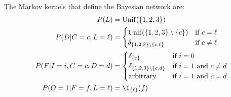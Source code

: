 \begin{enumerate}[label=7.\arabic*]
\begin{gradedsolution}
\begin{enumerate}
            The Markov kernels that define the Bayesian network are:
            \begin{align*}
                P(L)                & = \mathrm{Unif}(\{1, 2, 3\})                                             \\
                P(D|C=c, L=\ell)    & = \begin{cases}
                                            \mathrm{Unif}(\{1, 2, 3\}\setminus \{c\}) & \text{if $c=\ell$}    \\
                                            \delta_{\{1, 2, 3\}\setminus \{c, \ell\}} & \text{if $c\neq\ell$}
                                        \end{cases}      \\
                P(F|I=i, C=c, D=d)  & = \begin{cases}
                                            \delta_{\{c\}}                         & \text{if $i=0$}               \\
                                            \delta_{\{1, 2, 3\}\setminus \{c, d\}} & \text{if $i=1$ and $c\neq d$} \\
                                            \text{arbitrary}                       & \text{if $i=1$ and $c= d$}
                                        \end{cases} \\
                P(O=1 |F=f, L=\ell) & = \I_{\{\ell\}}(f)
            \end{align*}



\end{enumerate}
\end{gradedsolution}
\end{enumerate}
